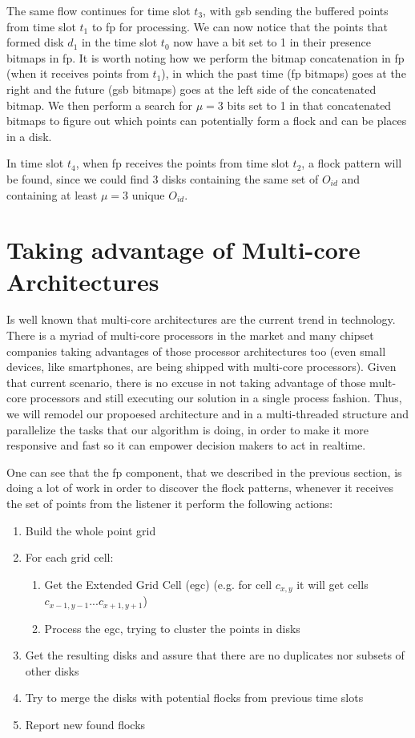 The same flow continues for time slot $t_3$, with \ac{gsb} sending the buffered points from time slot $t_1$ to \ac{fp}
for processing. We can now notice that the points that formed disk $d_1$ in the time slot $t_0$ now have a bit set to 1
in their presence bitmaps in \ac{fp}. It is worth noting how we perform the bitmap concatenation in \ac{fp} (when it
receives points from $t_1$), in which the past time (\ac{fp} bitmaps) goes at the right and the future (\ac{gsb}
bitmaps) goes at the left side of the concatenated bitmap. We then perform a search for $\mu = 3$ bits set to 1 in that
concatenated bitmaps to figure out which points can potentially form a flock and can be places in a disk.

In time slot $t_4$, when \ac{fp} receives the points from time slot $t_2$, a flock pattern will be found, since we could find
3 disks containing the same set of $O_{id}$ and containing at least $\mu = 3$ unique $O_{id}$.

\section{Taking advantage of Multi-core Architectures}
\label{sec:multithread}
Is well known that multi-core architectures are the current trend in technology. There is a myriad of multi-core
processors in the market and many chipset companies taking advantages of those processor architectures too (even small
devices, like smartphones, are being shipped with multi-core processors). Given that current scenario, there is no
excuse in not taking advantage of those mult-core processors and still executing our solution in a single process
fashion. Thus, we will remodel our propoesed architecture and in a multi-threaded structure and parallelize the tasks
that our algorithm is doing, in order to make it more responsive and fast so it can empower decision makers to act in
realtime.

One can see that the \ac{fp} component, that we described in the previous section, is doing a lot of work in order to
discover the flock patterns, whenever it receives the set of points from the listener it perform the following actions:

\begin{enumerate}
    \item Build the whole point grid
    \item For each grid cell:
    \begin{enumerate}
        \item Get the Extended Grid Cell (\ac{egc}) (e.g. for cell $c_{x,y}$ it will get cells
            $c_{x - 1, y - 1}...c_{x + 1, y+ 1}$)
        \item Process the \ac{egc}, trying to cluster the points in disks
    \end{enumerate}
    \item Get the resulting disks and assure that there are no duplicates nor subsets of other disks
    \item Try to merge the disks with potential flocks from previous time slots
    \item Report new found flocks
\end{enumerate}

